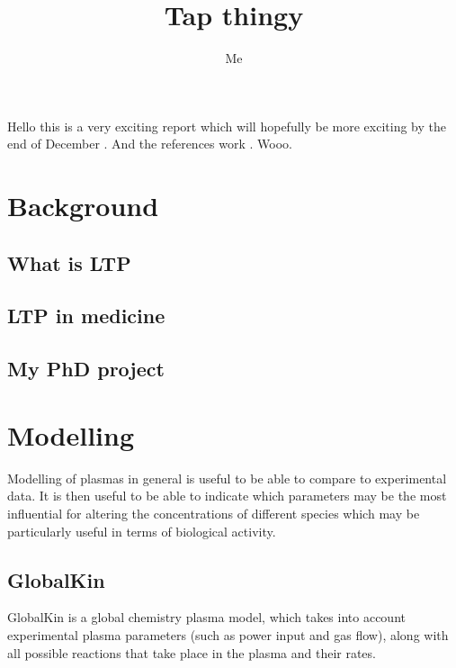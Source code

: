 \documentclass[11pt, oneside]{article}   	%
\title{Tap thingy}
\author{Me}
\begin{document}
\maketitle

Hello this is a very exciting report which will hopefully be more exciting by the end of December \cite{Weltmann2009}. And the references work \cite{Schroter2015atomic}. Wooo.

\section{Background}
\subsection{What is LTP}
\subsection{LTP in medicine}
\subsection{My PhD project}

\section{Modelling}
Modelling of plasmas in general is useful to be able to compare to experimental data. 
It is then useful to be able to indicate which parameters may be the most influential for altering the concentrations of different species which may be particularly useful in terms of biological activity.
\subsection{GlobalKin}
GlobalKin is a global chemistry plasma model, which takes into account experimental plasma parameters (such as power input and gas flow), along with all possible reactions that take place in the plasma and their rates.
\end{document}
